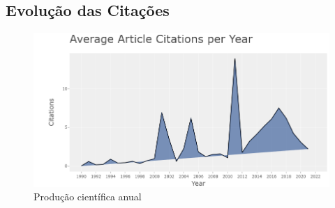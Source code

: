 \subsection{Evolução das Citações}

 \begin{figure}
    \centering
    \includegraphics[width=1\textwidth]{experiments/ABMHub/PesquisaBibliometrica/NLP/citationsPerYear.png}
    \caption{Produção científica anual}
    \label{fig:ABMHub:CPY}
\end{figure}